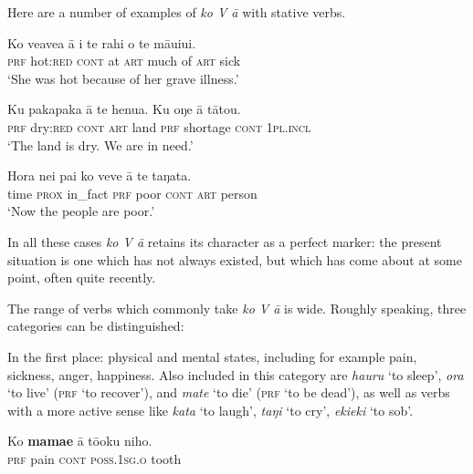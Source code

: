 Here are a number of examples of \textit{ko V {\ꞌ}ā} with stative verbs.

\ea\label{ex:7.62}
\gll Ko ve{\ꞌ}ave{\ꞌ}a {\ꞌ}ā {\ꞌ}i te rahi o te māuiui. \\
\textsc{prf} hot:\textsc{red} \textsc{cont} at \textsc{art} much of \textsc{art} sick \\

\glt 
‘She was hot because of her grave illness.’ \textstyleExampleref{[R229.229]} 
\z

\ea\label{ex:7.63}
\gll Ku pakapaka {\ꞌ}ā te henua. Ku oŋe {\ꞌ}ā tātou. \\
\textsc{prf} dry:\textsc{red} \textsc{cont} \textsc{art} land \textsc{prf} shortage \textsc{cont} \textsc{1pl.incl} \\

\glt 
‘The land is dry. We are in need.’ \textstyleExampleref{[R352.116]} 
\z

\ea\label{ex:7.64}
\gll Hora nei pa{\ꞌ}i ko veve {\ꞌ}ā te taŋata. \\
time \textsc{prox} in\_fact \textsc{prf} poor \textsc{cont} \textsc{art} person \\

\glt
‘Now the people are poor.’ \textstyleExampleref{[R250.128]} 
\z

In all these cases \textit{ko V {\ꞌ}ā} retains its character as a perfect  marker: the present situation is one which has not always existed, but which has come about at some point, often quite recently. 

The range of verbs which commonly take \textit{ko V {\ꞌ}ā} is wide. Roughly speaking, three categories can be distinguished:

In the first place: physical and mental states, including for example pain, sickness, anger, happiness. Also included in this category are \textit{ha{\ꞌ}uru} ‘to sleep’, \textit{ora} ‘to live’ (\textsc{prf} ‘to recover’), and \textit{mate} ‘to die’ (\textsc{prf} ‘to be dead’), as well as verbs with a more active sense like \textit{kata} ‘to laugh’, \textit{taŋi} ‘to cry’, \textit{{\ꞌ}eki{\ꞌ}eki} ‘to sob’.

\ea\label{ex:7.65}
\gll Ko \textbf{mamae} {\ꞌ}ā tō{\ꞌ}oku niho. \\
\textsc{prf} pain \textsc{cont} \textsc{poss.1sg.o} tooth \\

